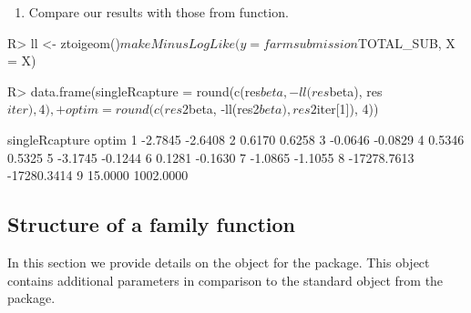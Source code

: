 \documentclass[
]{jss}
\providecommand{\tightlist}{%
  \setlength{\itemsep}{0pt}\setlength{\parskip}{0pt}}
\newcommand{\1}{\mathcal{I}} \newcommand{\bZero}{\boldsymbol{0}}
\begin{document}
\begin{enumerate}
\def\labelenumi{\arabic{enumi}.}
\setcounter{enumi}{4}
\tightlist
\item
  Compare our results with those from  function.
\end{enumerate}

\begin{CodeChunk}
\begin{CodeInput}
R> ll <- ztoigeom()$makeMinusLogLike(y = farmsubmission$TOTAL_SUB, X = X)
\end{CodeInput}
\end{CodeChunk}

\begin{CodeChunk}
\end{CodeChunk}

\begin{CodeChunk}
\begin{CodeInput}
R> data.frame(singleRcapture = round(c(res$beta, -ll(res$beta), res$iter), 4),
+            optim = round(c(res2$beta, -ll(res2$beta), res2$iter[1]), 4))
\end{CodeInput}
\begin{CodeOutput}
  singleRcapture       optim
1        -2.7845     -2.6408
2         0.6170      0.6258
3        -0.0646     -0.0829
4         0.5346      0.5325
5        -3.1745     -0.1244
6         0.1281     -0.1630
7        -1.0865     -1.1055
8    -17278.7613 -17280.3414
9        15.0000   1002.0000
\end{CodeOutput}
\end{CodeChunk}

\subsection{Structure of a family function}\label{sec-family}

In this section we provide details on the  object for the
 package. This object contains additional parameters
in comparison to the standard  object from the 
package.
\end{document}
